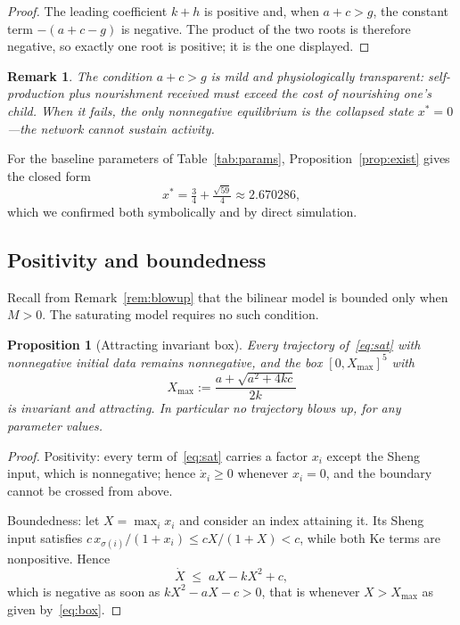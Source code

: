 \documentclass[11pt]{article}
\newtheorem{proposition}[theorem]{Proposition}
\newtheorem{remark}[theorem]{Remark}
\begin{document}
\begin{proof}
The leading coefficient $k+h$ is positive and, when $a+c>g$, the constant term
$-(a+c-g)$ is negative. The product of the two roots is therefore negative, so
exactly one root is positive; it is the one displayed.
\end{proof}

\begin{remark}
The condition $a+c>g$ is mild and physiologically transparent: self-production
plus nourishment received must exceed the cost of nourishing one's child. When it
fails, the only nonnegative equilibrium is the collapsed state $x^\ast=0$---the
network cannot sustain activity.
\end{remark}

For the baseline parameters of Table~\ref{tab:params},
Proposition~\ref{prop:exist} gives the closed form
\[
x^\ast=\tfrac{3}{4}+\tfrac{\sqrt{59}}{4}\approx 2.670286 ,
\]
which we confirmed both symbolically and by direct simulation.

\subsection{Positivity and boundedness}

Recall from Remark~\ref{rem:blowup} that the bilinear model is bounded only when
$M>0$. The saturating model requires no such condition.

\begin{proposition}[Attracting invariant box]\label{prop:box}
Every trajectory of~\eqref{eq:sat} with nonnegative initial data remains
nonnegative, and the box $[0,X_{\max}]^5$ with
\begin{equation}\label{eq:box}
X_{\max}:=\frac{a+\sqrt{a^2+4kc}}{2k}
\end{equation}
is invariant and attracting. In particular no trajectory blows up, for any
parameter values.
\end{proposition}

\begin{proof}
Positivity: every term of~\eqref{eq:sat} carries a factor $x_i$ except the Sheng
input, which is nonnegative; hence $\dot x_i\ge 0$ whenever $x_i=0$, and the
boundary cannot be crossed from above.

Boundedness: let $X=\max_i x_i$ and consider an index attaining it. Its Sheng
input satisfies $c\,x_{\sigma(i)}/(1+x_i)\le cX/(1+X)<c$, while both Ke terms are
nonpositive. Hence
\[
\dot X \;\le\; aX - kX^2 + c ,
\]
which is negative as soon as $kX^2-aX-c>0$, that is whenever $X>X_{\max}$ as
given by~\eqref{eq:box}.
\end{proof}
\end{document}
